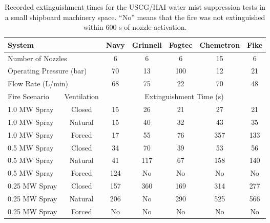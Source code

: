 \begin{table}[h!]
\caption[USCG/HAI water mist suppression extinguishment times.]{Recorded extinguishment times for the USCG/HAI water mist suppression tests in a small shipboard machinery space. ``No''
means that the fire was not extinguished within 600 s of nozzle activation.}
\begin{center}
\begin{tabular}{|l|c|c|c|c|c|c|}
\hline
\multicolumn{2}{|l|}{System}                        & Navy  & Grinnell  & Fogtec    & Chemetron & Fike   \\ \hline  \hline
\multicolumn{2}{|l|}{Number of Nozzles}             & 6     & 6         & 6         & 15        & 6      \\ \hline
\multicolumn{2}{|l|}{Operating Pressure (bar)}      & 70    & 13        & 100       & 12        & 21     \\ \hline
\multicolumn{2}{|l|}{Flow Rate (L/min)}             & 68    & 75        & 22        & 70        & 48     \\ \hline \hline
Fire Scenario       & Ventilation                   & \multicolumn{5}{c|}{Extinguishment Time (s)}      \\ \hline \hline
1.0 MW Spray        & Closed                        & 15    & 26        & 21        & 27        & 21     \\ \hline
1.0 MW Spray        & Natural                       & 15    & 40        & 32        & 43        & 35     \\ \hline
1.0 MW Spray        & Forced                        & 17    & 55        & 76        & 357       & 133    \\ \hline
0.5 MW Spray        & Closed                        & 34    & 70        & 39        & 53        & 56     \\ \hline
0.5 MW Spray        & Natural                       & 41    & 117       & 67        & 158       & 140    \\ \hline
0.5 MW Spray        & Forced                        & 124   & No        & No        & No        & No     \\ \hline
0.25 MW Spray       & Closed                        & 157   & 360       & 169       & 314       & 277    \\ \hline
0.25 MW Spray       & Natural                       & 206   & No        & 290       & 525       & 566    \\ \hline
0.25 MW Spray       & Forced                        & No    & No        & No        & No        & No     \\ \hline
\end{tabular}
\end{center}
\label{USCG_HAI_Times}
\end{table}

